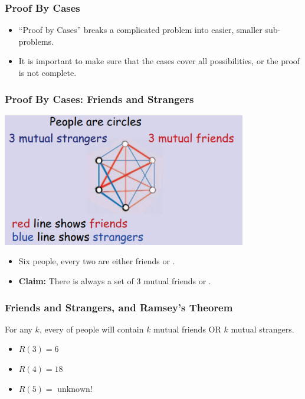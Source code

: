 \documentclass{beamer}
\begin{document}
\begin{frame}
  \frametitle{Proof By Cases}

  \begin{itemize}
  \item ``Proof by Cases'' breaks a complicated problem into easier, smaller sub-problems.

    \bigskip

  \item It is important to make sure that \alert{the cases cover all possibilities}, or the
    proof is not complete.
  \end{itemize}
\end{frame}

\begin{frame}
  \frametitle{Proof By Cases: Friends and Strangers}

  \begin{center}
    \includegraphics[width=0.8\textwidth]{../img/friends_and_strangers}
  \end{center}

  \begin{itemize}
  \item Six people, every two are either \alert{friends} or .
  \item {\bf Claim:} There is always a set of \alert{3 mutual
    friends} or .
  \end{itemize}

\end{frame}

\begin{frame}
  \frametitle{Friends and Strangers, and Ramsey's Theorem}

  For any $k$, every  of people
  will contain $k$ mutual friends OR $k$ mutual strangers.

  \bigskip

  \begin{itemize}
  \item $R(3) = 6$
  \item $R(4) = 18$
  \item $R(5) = \text{ unknown!}$
  \end{itemize}
\end{frame}
\end{document}
